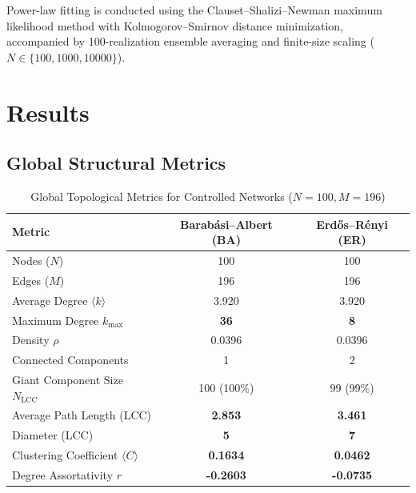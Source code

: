 \documentclass[11pt,a4paper]{article}
\begin{document}
Power-law fitting is conducted using the Clauset--Shalizi--Newman maximum likelihood method with Kolmogorov--Smirnov distance minimization, accompanied by 100-realization ensemble averaging and finite-size scaling ($N \in \{100, 1000, 10000\}$).

\section{Results}

\subsection{Global Structural Metrics}
\begin{table}[ht]
\centering
\caption{Global Topological Metrics for Controlled Networks ($N=100, M=196$)}
\label{tab:global_metrics}
\begin{tabular}{lcc}
\toprule
\textbf{Metric} & \textbf{Barab\'asi--Albert (BA)} & \textbf{Erd\H{o}s--R\'enyi (ER)} \\
\midrule
Nodes ($N$) & 100 & 100 \\
Edges ($M$) & 196 & 196 \\
Average Degree $\langle k \rangle$ & 3.920 & 3.920 \\
Maximum Degree $k_{\max}$ & \textbf{36} & \textbf{8} \\
Density $\rho$ & 0.0396 & 0.0396 \\
Connected Components & 1 & 2 \\
Giant Component Size $N_{\text{LCC}}$ & 100 (100\%) & 99 (99\%) \\
Average Path Length (LCC) & \textbf{2.853} & \textbf{3.461} \\
Diameter (LCC) & \textbf{5} & \textbf{7} \\
Clustering Coefficient $\langle C \rangle$ & \textbf{0.1634} & \textbf{0.0462} \\
Degree Assortativity $r$ & \textbf{-0.2603} & \textbf{-0.0735} \\
\bottomrule
\end{tabular}
\end{table}
\end{document}
